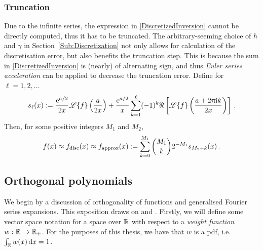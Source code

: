 \subsubsection{Truncation}

Due to the infinite series, the expression in \eqref{DiscretizedInversion} cannot be directly computed, thus it has to be truncated.
The arbitrary-seeming choice of $h$ and $\gamma$ in Section~\ref{Sub:Discretization} not only allows for calculation of the discretisation error, but also benefits the truncation step. This is because the sum in \eqref{DiscretizedInversion} is (nearly) of alternating sign, and thus \emph{Euler series acceleration} can be applied to decrease the truncation error. Define for $\ell=1,2,\dots$
\begin{equation*} \label{TruncatedInversion}
s_\ell(x) := \frac{\mathrm{e}^{a/2}}{2x}\mathscr{L}\{f\} \left(\frac{a}{2 x}\right) + \frac{\mathrm{e}^{a/2}}{x} \sum_{k=1}^\ell (-1)^{k} \Re\left[\mathscr{L}\{f\}\left(\frac{a+ 2\uppi \mathrm{i} k}{2 x}\right)\right] \,.
\end{equation*}
Then, for some positive integers $M_1$ and $M_2$,
\begin{equation}\label{eq:FinalApproxLaplaceInversion}
f(x) \approx f_{\text{disc}}(x) \approx f_{\text{approx}}(x) := \sum_{k=0}^{M_1} \binom{M_1}{k} 2^{-M_1} s_{M_2+k}(x) \,.
\end{equation}

\subsection{Orthogonal polynomials} \label{subsc:ortho_poly}



We begin by a discussion of orthogonality of functions and generalised Fourier series expansions. This exposition draws on \cite{Szegoe1939} and \cite{gautschi2011numerical}. Firstly, we will define some vector space notation for a space over $\mathbb{R}$ with respect to a \emph{weight function} $w : \mathbb{R} \to \mathbb{R}_+$. For the purposes of this thesis, we have that $w$ is a pdf, i.e.\ $\int_{\mathbb{R}} w(x) \mathop{}\!\mathrm{d} x = 1$.


